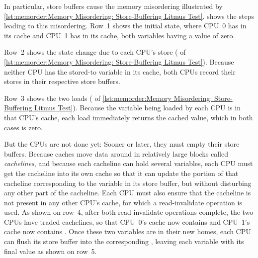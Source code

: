In particular, store buffers cause the memory misordering
illustrated by
\cref{lst:memorder:Memory Misordering: Store-Buffering Litmus Test}.
shows the steps leading to this misordering.
Row~1 shows the initial state, where CPU~0 has  in its cache
and CPU~1 has  in its cache, both variables having a value of zero.
\begin{fcvref}
Row~2 shows the state change due to each CPU's store ( of
\cref{lst:memorder:Memory Misordering: Store-Buffering Litmus Test}).
Because neither CPU has the stored-to variable in its cache, both CPUs
record their stores in their respective store buffers.
\end{fcvref}

\QuickQuizEnd

\begin{fcvref}
Row~3 shows the two loads ( of
\cref{lst:memorder:Memory Misordering: Store-Buffering Litmus Test}).
Because the variable being loaded by each CPU is in that CPU's cache,
each load immediately returns the cached value, which in both cases
is zero.
\end{fcvref}

But the CPUs are not done yet:
Sooner or later, they must empty their store buffers.
Because caches move data around in relatively large blocks called
\emph{cachelines}, and because each cacheline can hold several
variables, each CPU must get the cacheline into its own cache so
that it can update the portion of that cacheline corresponding
to the variable in its store buffer, but without disturbing any
other part of the cacheline.
Each CPU must also ensure that the cacheline is not present in any other
CPU's cache, for which a read-invalidate operation is used.
As shown on row~4, after both read-invalidate operations complete,
the two CPUs have traded cachelines, so that CPU~0's cache now contains
 and CPU~1's cache now contains .
Once these two variables are in their new homes, each CPU can flush
its store buffer into the corresponding , leaving each
variable with its final value as shown on row~5.


